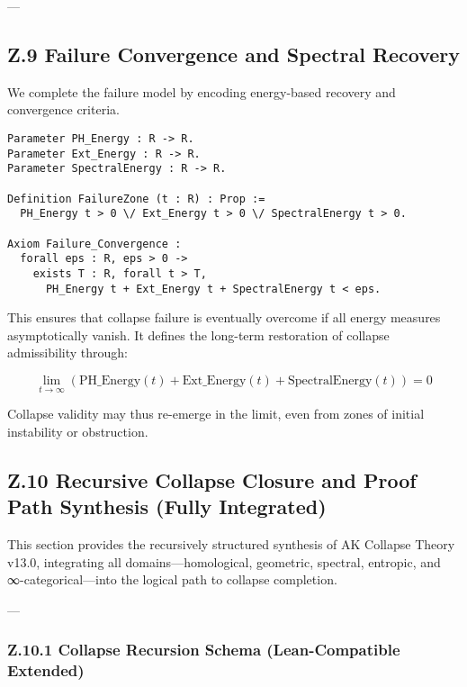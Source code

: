 \documentclass[11pt]{article}
\begin{document}
---

\subsection*{Z.9 Failure Convergence and Spectral Recovery}

We complete the failure model by encoding energy-based recovery and convergence criteria.

\begin{lstlisting}[language=Coq]
Parameter PH_Energy : R -> R.
Parameter Ext_Energy : R -> R.
Parameter SpectralEnergy : R -> R.

Definition FailureZone (t : R) : Prop :=
  PH_Energy t > 0 \/ Ext_Energy t > 0 \/ SpectralEnergy t > 0.

Axiom Failure_Convergence :
  forall eps : R, eps > 0 ->
    exists T : R, forall t > T,
      PH_Energy t + Ext_Energy t + SpectralEnergy t < eps.
\end{lstlisting}

This ensures that collapse failure is eventually overcome if all energy measures asymptotically vanish.  
It defines the long-term restoration of collapse admissibility through:

\[
\lim_{t \to \infty} (\mathrm{PH\_Energy}(t) + \mathrm{Ext\_Energy}(t) + \mathrm{SpectralEnergy}(t)) = 0
\]

Collapse validity may thus re-emerge in the limit, even from zones of initial instability or obstruction.



\subsection*{Z.10 Recursive Collapse Closure and Proof Path Synthesis (Fully Integrated)}

This section provides the recursively structured synthesis of AK Collapse Theory v13.0, integrating all domains—homological, geometric, spectral, entropic, and ∞-categorical—into the logical path to collapse completion.

---

\subsubsection*{Z.10.1 Collapse Recursion Schema (Lean-Compatible Extended)}
\end{document}
